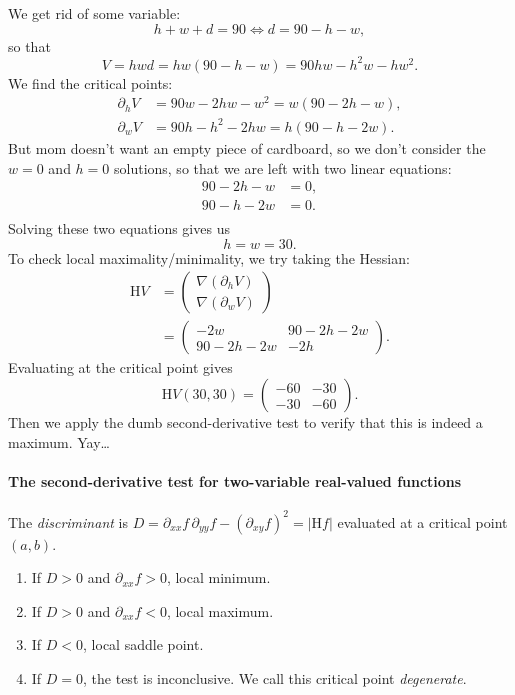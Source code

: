\documentclass[11pt]{article}
\newcommand{\hessian}{\mathrm H}
\begin{document}
We get rid of some variable:
\[
	h+w+d = 90 \iff d = 90-h-w,
\]
so that
\[
	V = hwd = hw(90-h-w) = 90hw - h^2 w - h w^2.
\]
We find the critical points:
\begin{align*}
	\partial_h V &= 90w - 2hw - w^2 = w(90-2h-w), \\
	\partial_w V &= 90h - h^2 - 2hw = h(90-h-2w).
\end{align*}
But mom doesn't want an empty piece of cardboard, so we don't consider the \(w = 0\) and \(h = 0\) solutions, so that we are left with two linear equations:
\begin{align*}
	90-2h-w &= 0, \\
	90-h-2w &= 0. \\
\end{align*}
Solving these two equations gives us
\[
	h = w = 30.
\]
To check local maximality/minimality, we try taking the Hessian:
\begin{align*}
	\hessian V &= \begin{pmatrix} \nabla (\partial_h V) \\ \nabla (\partial_w V) \end{pmatrix} \\
	&= \begin{pmatrix}
		-2w & 90-2h-2w \\
		90-2h-2w & -2h
	\end{pmatrix}.
\end{align*}
Evaluating at the critical point gives
\[
	\hessian V(30, 30) =
	\begin{pmatrix}
		-60 & -30 \\
		-30 & -60
	\end{pmatrix}.
\]
Then we apply the dumb second-derivative test to verify that this is indeed a maximum. Yay\dots

\paragraph{The second-derivative test for two-variable real-valued functions}

The \emph{discriminant} is \(D = \partial_{xx} f \, \partial_{yy} f - (\partial_{xy} f)^2 = |\hessian f|\) evaluated at a critical point \((a, b)\).

\begin{enumerate}
\item If \(D > 0\) and \(\partial_{xx} f > 0\), local minimum.
\item If \(D > 0\) and \(\partial_{xx} f < 0\), local maximum.
\item If \(D < 0\), local saddle point.
\item If \(D = 0\), the test is inconclusive. We call this critical point \emph{degenerate}.
\end{enumerate}
\end{document}
